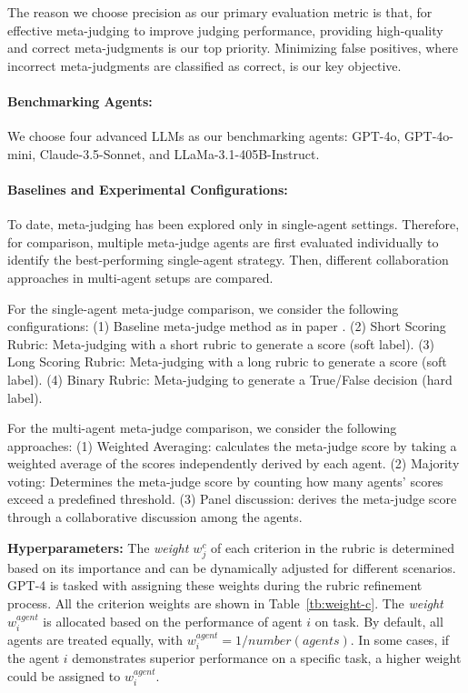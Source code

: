 \documentclass{article}
\theoremstyle{plain}
\theoremstyle{definition}
\theoremstyle{remark}
\begin{document}
The reason we choose precision as our primary evaluation metric is that, for effective meta-judging to improve judging performance, providing high-quality and correct meta-judgments is our top priority. Minimizing false positives, where incorrect meta-judgments are classified as correct, is our key objective.

\paragraph{Benchmarking Agents:}
We choose four advanced LLMs as our benchmarking agents: GPT-4o, GPT-4o-mini, Claude-3.5-Sonnet, and LLaMa-3.1-405B-Instruct.

\paragraph{Baselines and Experimental Configurations:}
To date, meta-judging has been explored only in single-agent settings. Therefore, for comparison, multiple meta-judge agents are first evaluated individually to identify the best-performing single-agent strategy. Then, different collaboration approaches in multi-agent setups are compared. 

For the single-agent meta-judge comparison, we consider the following configurations:
(1) Baseline meta-judge method as in paper \cite{14-wu2024meta}.
(2) Short Scoring Rubric: Meta-judging with a short rubric to generate a score (soft label).
(3) Long Scoring Rubric: Meta-judging with a long rubric to generate a score (soft label).
(4) Binary Rubric: Meta-judging to generate a True/False decision (hard label).

For the multi-agent meta-judge comparison, we consider the following approaches:
(1) Weighted Averaging: calculates the meta-judge score by taking a weighted average of the scores independently derived by each agent.
(2) Majority voting: Determines the meta-judge score by counting how many agents' scores exceed a predefined threshold.
(3) Panel discussion: derives the meta-judge score through a collaborative discussion among the agents.

\textbf{Hyperparameters:} 
The \textit{weight $w_{j}^{c}$} of each criterion in the rubric is determined based on its importance and can be dynamically adjusted for different scenarios. GPT-4 is tasked with assigning these weights during the rubric refinement process. All the criterion weights are shown in Table~\ref{tb:weight-c}.
The \textit{weight $w_{i}^{agent}$} is allocated based on the performance of agent $i$ on task. By default, all agents are treated equally, with $w_{i}^{agent}=1/{number(agents)}$. In some cases, if the agent $i$ demonstrates superior performance on a specific task, a higher weight could be assigned to $w_{i}^{agent}$.
\end{document}
